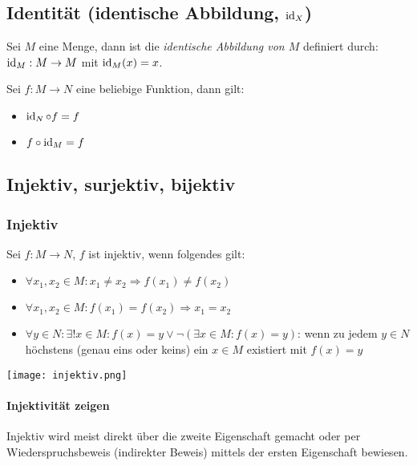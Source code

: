 \subsection{Identität (identische Abbildung, $\operatorname{id}_X$)}
Sei $M$ eine Menge, dann ist die \textit{identische Abbildung von $M$} definiert durch:
$\operatorname{id}_M: M \rightarrow M$ mit $\operatorname{id}_M(x) = x$.

Sei $f: M \rightarrow N$ eine beliebige Funktion, dann gilt:
\begin{itemize}
	\item $\operatorname{id}_N \circ f = f$
	\item $f \circ \operatorname{id}_M = f$
\end{itemize}

\subsection{Injektiv, surjektiv, bijektiv}
\subsubsection{Injektiv}
Sei $f: M \rightarrow N$, $f$ ist injektiv, wenn folgendes gilt:
\begin{itemize}
	\item $\forall x_1, x_2 \in M: x_1 \neq x_2 \Rightarrow f(x_1) \neq f(x_2)$
	\item $\forall x_1, x_2 \in M: f(x_1) = f(x_2) \Rightarrow x_1 = x_2$
	\item $\forall y \in N: \exists !x \in M: f(x) = y \lor \lnot(\exists x \in M: f(x) = y)$: wenn zu jedem $y \in N$ höchstens (genau eins oder keins) ein $x \in M$ existiert mit $f(x) = y$
\end{itemize}

\texttt{[image: injektiv.png]}

\paragraph{Injektivität zeigen}
Injektiv wird meist direkt über die zweite Eigenschaft gemacht oder per Wiederspruchsbeweis (indirekter Beweis) mittels der ersten Eigenschaft bewiesen.


